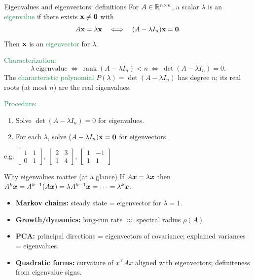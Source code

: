 \documentclass{beamer}
\DeclareMathOperator{\rank}{rank}
\begin{document}
\begin{frame}{Eigenvalues and eigenvectors: definitions}
For $A\in\mathbb R^{n\times n}$, a scalar $\lambda$ is an \textcolor{SeaGreen}{eigenvalue} if there exists ${\bf x}\neq{\bf 0}$ with
\[
A{\bf x}=\lambda{\bf x}
\quad\Longleftrightarrow\quad
(A-\lambda I_n){\bf x}={\bf 0}.
\]
Then ${\bf x}$ is an \textcolor{SeaGreen}{eigenvector} for $\lambda$.
\medskip

\textcolor{SeaGreen}{Characterization:}
\[
\lambda\ \text{eigenvalue}
\ \Longleftrightarrow\
\rank(A-\lambda I_n)<n
\ \Longleftrightarrow\
\det(A-\lambda I_n)=0.
\]
The \textcolor{SeaGreen}{characteristic polynomial} $P(\lambda)=\det(A-\lambda I_n)$ has degree $n$; its real roots (at most $n$) are the real eigenvalues.
\medskip

\textcolor{SeaGreen}{Procedure:}
\begin{enumerate}
\item Solve $\det(A-\lambda I_n)=0$ for eigenvalues.
\item For each $\lambda$, solve $(A-\lambda I_n){\bf x}={\bf 0}$ for eigenvectors.
\end{enumerate}
{\tiny e,g. $\begin{bmatrix}
	1 & 1\\
	0 & 1
\end{bmatrix}$, $\begin{bmatrix}
	2 & 3\\
	1 & 4
\end{bmatrix}$, $\begin{bmatrix}
	1 & -1\\
	1 & 1
\end{bmatrix}$}
\end{frame}


\begin{frame}{Why eigenvalues matter (at a glance)}
If $A\boldsymbol x=\lambda \boldsymbol x$ then $A^k\boldsymbol x=A^{k-1}(A\boldsymbol x)=\lambda A^{k-1}\boldsymbol x=\cdots=\lambda^k \boldsymbol x$.\\[3mm]
\begin{itemize}
\item \textbf{Markov chains:} steady state = eigenvector for $\lambda=1$.
\item \textbf{Growth/dynamics:} long-run rate $\approx$ spectral radius $\rho(A)$.
\item \textbf{PCA:} principal directions = eigenvectors of covariance; explained variances = eigenvalues.
\item \textbf{Quadratic forms:} curvature of $x^\top A x$ aligned with eigenvectors; definiteness from eigenvalue signs.
\end{itemize}
\end{frame}
\end{document}
